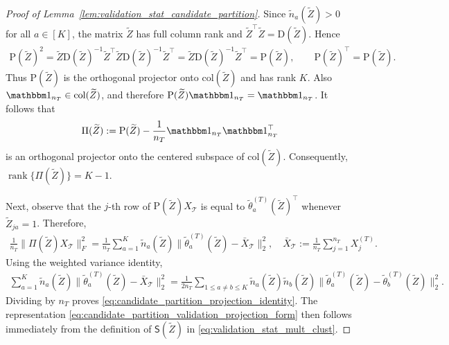 \documentclass[10pt]{article}
\newcommand{\col}{\mathrm{col}}
\newcommand{\wh}{\widehat}
\newcommand{\wt}{\widetilde}
\newcommand{\calT}{\mathcal T}
\newcommand{\trg}{T}
\newcommand{\nT}{n_{\trg}}
\newcommand{\Xtar}{X^{(\trg)}}
\begin{document}
\begin{proof}[Proof of Lemma~\ref{lem:validation_stat_candidate_partition}]
Since $\wt n_a(\wt Z)>0$ for all $a\in[K]$, the matrix $\wt Z$ has full column rank and $\wt Z^\top\wt Z=\mathrm D(\wt Z)$. Hence
\begin{align}
    \mathrm P(\wt Z)^2=\wt Z\mathrm D(\wt Z)^{-1}\wt Z^\top\wt Z\mathrm D(\wt Z)^{-1}\wt Z^\top=\wt Z\mathrm D(\wt Z)^{-1}\wt Z^\top=\mathrm P(\wt Z),
    \qquad
    \mathrm P(\wt Z)^\top=\mathrm P(\wt Z).
\end{align}
Thus $\mathrm P(\wt Z)$ is the orthogonal projector onto $\col(\wt Z)$ and has
rank $K$. Also $\mathbbm 1_{\nT}\in\col(\wt Z)$, and therefore
$\mathrm P(\wt Z)\mathbbm 1_{\nT}=\mathbbm 1_{\nT}$. It follows that
\begin{align}
    \Pi(\wt Z):=\mathrm P(\wt Z)-\frac{1}{\nT}\mathbbm 1_{\nT}\mathbbm 1_{\nT}^\top
\end{align}
is an orthogonal projector onto the centered subspace of $\col(\wt Z)$. Consequently, $\operatorname{rank}\{\Pi(\wt Z)\}=K-1$.

Next, observe that the $j$-th row of $\mathrm P(\wt Z)X_\calT$ is equal to $\wt{\theta}^{(\trg)}_a(\wt Z)^\top$ whenever $\wt Z_{ja}=1$. Therefore,
\begin{align}
    \frac{1}{\nT}\|\Pi(\wt Z)X_\calT\|_F^2
    =
    \frac{1}{\nT}\sum_{a=1}^K \wt n_a(\wt Z)
    \|\wt{\theta}^{(\trg)}_a(\wt Z)-\bar X_\calT\|_2^2,
    \quad
    \bar X_\calT:=\frac{1}{\nT}\sum_{j=1}^{\nT}\Xtar_j.
\end{align}
Using the weighted variance identity,
\begin{align}
    \sum_{a=1}^K \wt n_a(\wt Z)\|\wt{\theta}^{(\trg)}_a(\wt Z)-\bar X_\calT\|_2^2
    =
    \frac{1}{2\nT}\sum_{1\le a\neq b\le K}\wt n_a(\wt Z)\wt n_b(\wt Z)
    \|\wt{\theta}^{(\trg)}_a(\wt Z)-\wt{\theta}^{(\trg)}_b(\wt Z)\|_2^2.
\end{align}
Dividing by $\nT$ proves \eqref{eq:candidate_partition_projection_identity}.
The representation \eqref{eq:candidate_partition_validation_projection_form}
then follows immediately from the definition of
$\wh{\mathsf S}(\wt Z)$ in \eqref{eq:validation_stat_mult_clust}.


\end{proof}
\end{document}
